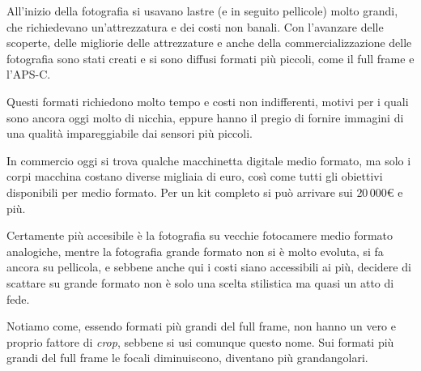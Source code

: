 All'inizio della fotografia si usavano lastre (e in seguito pellicole) molto grandi, che richiedevano un'attrezzatura e dei costi non banali. Con l'avanzare delle scoperte, delle migliorie delle attrezzature e anche della commercializzazione delle fotografia sono stati creati e si sono diffusi formati più piccoli, come il full frame e l'APS-C.

Questi formati richiedono molto tempo e costi non indifferenti, motivi per i quali sono ancora oggi molto di nicchia, eppure hanno il pregio di fornire immagini di una qualità impareggiabile dai sensori più piccoli.

In commercio oggi si trova qualche macchinetta digitale medio formato, ma solo i corpi macchina costano diverse migliaia di euro, così come tutti gli obiettivi disponibili per medio formato. Per un kit completo si può arrivare sui $20\,000 \euro{}$ e più.

Certamente più accesibile è la fotografia su vecchie fotocamere medio formato analogiche, mentre la fotografia grande formato non si è molto evoluta, si fa ancora su pellicola, e sebbene anche qui i costi siano accessibili ai più, decidere di scattare su grande formato non è solo una scelta stilistica ma quasi un atto di fede.

Notiamo come, essendo formati più grandi del full frame, non hanno un vero e proprio fattore di \textit{crop}, sebbene si usi comunque questo nome. Sui formati più grandi del full frame le focali diminuiscono, diventano più grandangolari.